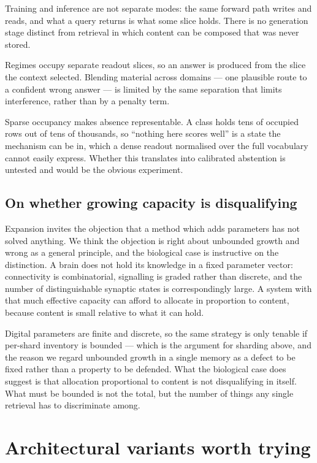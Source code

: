 \documentclass[11pt,a4paper]{article}
\begin{document}
Training and inference are not separate modes: the same forward path writes and
reads, and what a query returns is what some slice holds. There is no
generation stage distinct from retrieval in which content can be composed that
was never stored.

Regimes occupy separate readout slices, so an answer is produced from the slice
the context selected. Blending material across domains --- one plausible route
to a confident wrong answer --- is limited by the same separation that limits
interference, rather than by a penalty term.

Sparse occupancy makes absence representable. A class holds tens of occupied
rows out of tens of thousands, so ``nothing here scores well'' is a state the
mechanism can be in, which a dense readout normalised over the full vocabulary
cannot easily express. Whether this translates into calibrated abstention is
untested and would be the obvious experiment.

\subsection{On whether growing capacity is disqualifying}

Expansion invites the objection that a method which adds parameters has not
solved anything. We think the objection is right about unbounded growth and
wrong as a general principle, and the biological case is instructive on the
distinction. A brain does not hold its knowledge in a fixed parameter vector:
connectivity is combinatorial, signalling is graded rather than discrete, and
the number of distinguishable synaptic states is correspondingly large. A
system with that much effective capacity can afford to allocate in proportion
to content, because content is small relative to what it can hold.

Digital parameters are finite and discrete, so the same strategy is only
tenable if per-shard inventory is bounded --- which is the argument for
sharding above, and the reason we regard unbounded growth in a single memory as
a defect to be fixed rather than a property to be defended. What the biological
case does suggest is that allocation proportional to content is not
disqualifying in itself. What must be bounded is not the total, but the number
of things any single retrieval has to discriminate among.

\section{Architectural variants worth trying}
\label{sec:variants}
\end{document}
